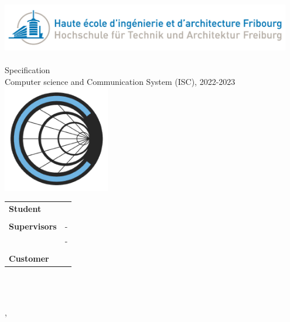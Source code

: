 
\begin{titlepage}
	{\selectfont
		\begin{center}
			\includegraphics[width=0.95\textwidth]{05-resources/img/heiafr_logo}
			~\\[1.5cm]
			{
				\Huge
				\ThesisTitle\\Specification \\[0.5cm]
				\large Computer science and Communication System (ISC), 2022-2023\\[2cm]
			}
			\includegraphics[width=0.35\textwidth]{05-resources/img/logo.png}
			~\\[2cm]
			{
				\begin{center}
				\begin{tabularx}{\textwidth} { %
					>{\raggedright\arraybackslash}X
					>{\raggedright\arraybackslash}X  }
						 \textbf{Student} & \Author\\
						 & \\
						 \textbf{Supervisors} & \Advisor \space - \AdvisorSchool \\ & \AdvisorTwo \space - \AdvisorTwoSchool \\
						 & \\
						 \textbf{Customer} & \Mendant\\
				\end{tabularx}
				\end{center}
				~\\[1.5cm]
			}

			\vfill



			{\specificationVersion}\\
			{\large \Place, \Date}

		\end{center}
	}
	\restoregeometry
	\end{titlepage}




